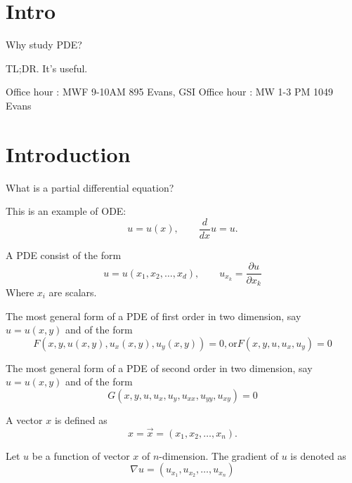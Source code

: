 \section*{Intro}
\begin{question}
	Why study PDE?
\end{question}
\begin{answer}
	TL;DR. It's useful.
\end{answer}
\begin{note}
	Office hour : MWF 9-10AM 895 Evans, GSI Office hour : MW 1-3 PM 1049 Evans
\end{note}
\section{Introduction}
\begin{question}
	What is a partial differential equation?
\end{question}
\begin{example}
	This is an example of ODE:
	\[ u  = u(x), \qquad \frac{d}{dx} u = u.\]
\end{example}
\begin{example}
	A PDE consist of the form
	\[ u = u(x_1, x_2, \ldots, x_d), \qquad u_{x_k} = \frac{\partial u}{\partial x_k}\]
	Where $x_i$ are scalars.
\end{example}
\begin{example}
	The most general form of a PDE of first order in two dimension, say $u = u(x,y)$ and of the form
	\[ F(x,y,u(x,y), u_x(x,y),u_y(x,y)) = 0 , \mathrm{ or } F(x,y,u, u_x, u_y) = 0\]

\end{example}
\begin{example}
	The most general form of a PDE of second order in two dimension, say $u = u(x,y)$ and of the form
	\[ G(x,y,u, u_x, u_y, u_{xx}, u_{yy}, u_{xy}) = 0 \]
\end{example}
\begin{definition}
	A vector $x$ is defined as
	\[ x = \vec x = (x_1, x_2, \ldots, x_n).\]
\end{definition}
\begin{definition}
	Let $u$ be a function of vector $x$ of $n$-dimension. The gradient of $u$ is denoted as
	\[ \nabla u = (u_{x_1}, u_{x_2}, \ldots, u_{x_n})\]
\end{definition}
